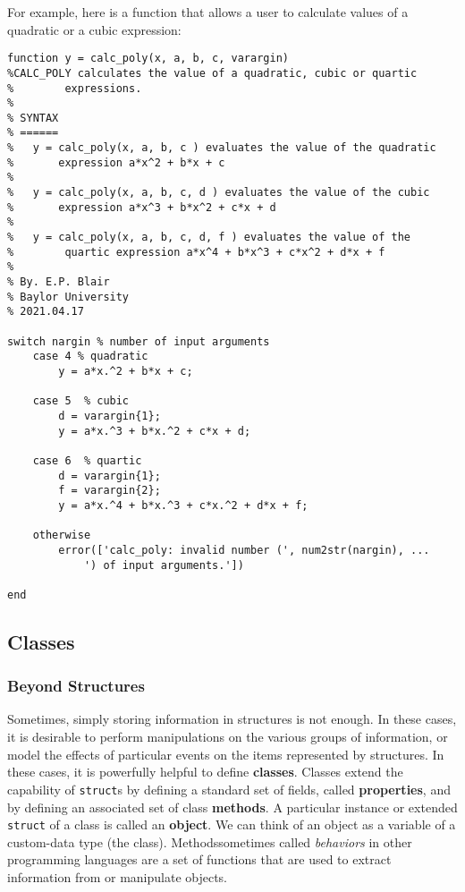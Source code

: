 For example, here is a function that allows a user to calculate values of a quadratic or a cubic expression:
\begin{lstlisting}[style=Matlab-editor]
function y = calc_poly(x, a, b, c, varargin)
%CALC_POLY calculates the value of a quadratic, cubic or quartic
%        expressions.
%
% SYNTAX
% ======
%   y = calc_poly(x, a, b, c ) evaluates the value of the quadratic
%       expression a*x^2 + b*x + c
%
%   y = calc_poly(x, a, b, c, d ) evaluates the value of the cubic
%       expression a*x^3 + b*x^2 + c*x + d
%
%   y = calc_poly(x, a, b, c, d, f ) evaluates the value of the
%        quartic expression a*x^4 + b*x^3 + c*x^2 + d*x + f
%
% By. E.P. Blair
% Baylor University
% 2021.04.17

switch nargin % number of input arguments
    case 4 % quadratic
        y = a*x.^2 + b*x + c;
        
    case 5  % cubic
        d = varargin{1};
        y = a*x.^3 + b*x.^2 + c*x + d;
        
    case 6  % quartic
        d = varargin{1};
        f = varargin{2};
        y = a*x.^4 + b*x.^3 + c*x.^2 + d*x + f;

    otherwise
        error(['calc_poly: invalid number (', num2str(nargin), ...
            ') of input arguments.'])

end
\end{lstlisting}




\subsection{Classes}

\subsubsection{Beyond Structures}
Sometimes, simply storing information in structures is not enough. In these cases, it is desirable to perform manipulations on the various groups of information, or model the effects of particular events on the items represented by structures. In these cases, it is powerfully helpful to define \textbf{classes}. Classes extend the capability of \texttt{struct}s by defining a standard set of fields, called \textbf{properties}, and by defining an associated set of class \textbf{methods}. A particular instance or extended \texttt{struct} of a class is called an \textbf{object}. We can think of an object as a variable of a custom-data type (the class). Methods\textemdash sometimes called \textit{behaviors} in other programming languages \textemdash are a set of functions that are used to extract information from or manipulate objects.

